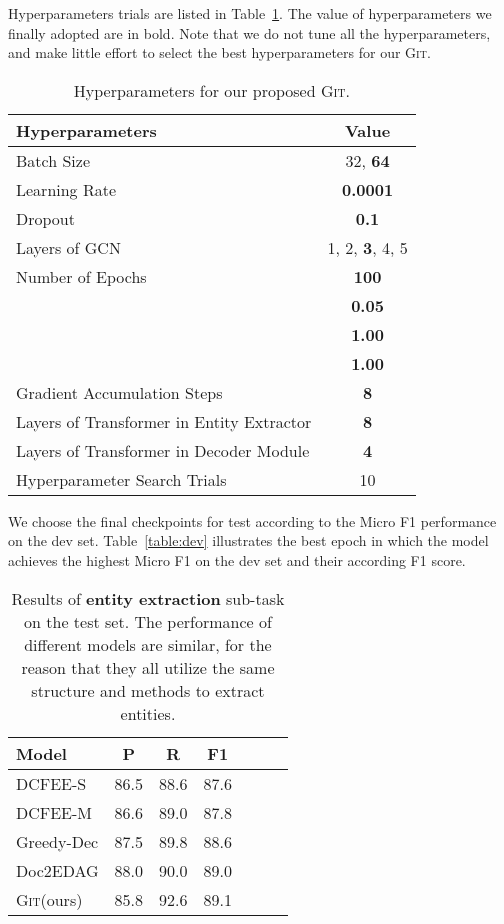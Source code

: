 \documentclass[11pt,a4paper]{article}
\newcommand{\modelname}{\textsc{Git}\xspace}
\begin{document}
Hyperparameters trials are listed in Table~\ref{tab:hyperparam}. 
The value of hyperparameters we finally adopted are in bold. 
Note that we do not tune all the hyperparameters, and make little effort to select the best hyperparameters for our \modelname.

\begin{table}[htbp]
\small
\centering
\begin{tabular}{lc}
\hline
\bf Hyperparameters & \bf Value \\
\hline
Batch Size &  32, \textbf{64} \\
Learning Rate  & \textbf{0.0001}  \\
Dropout &  \textbf{0.1}\\
Layers of GCN & 1, 2, \textbf{3}, 4, 5 \\
Number of Epochs & \textbf{100} \\
 & \textbf{0.05} \\
 & \textbf{1.00} \\
 & \textbf{1.00} \\
Gradient Accumulation Steps & \textbf{8} \\
Layers of Transformer in Entity Extractor & \textbf{8} \\
Layers of Transformer in Decoder Module & \textbf{4} \\
\hline \hline
Hyperparameter Search Trials & 10 \\
\hline
\end{tabular}
\caption{Hyperparameters for our proposed \modelname.
}
\label{tab:hyperparam}
\end{table}

We choose the final checkpoints for test according to the Micro F1 performance on the dev set. 
Table~\ref{table:dev} illustrates the best epoch in which the model achieves the highest Micro F1 on the dev set and their according F1 score.

\begin{table}[htbp]
\centering
\begin{tabular}{lcccccc}
\hline
\bf Model & \bf P & \bf R & \bf F1 \\
\hline
DCFEE-S  & 86.5 & 88.6 & 87.6 \\
DCFEE-M  & 86.6 & 89.0 & 87.8 \\
Greedy-Dec & 87.5 & 89.8 & 88.6 \\
Doc2EDAG  &  88.0 & 90.0 & 89.0\\
\hline
\modelname (ours) & 85.8 & 92.6 & 89.1 \\
\hline
\end{tabular}
\caption{Results of \textbf{entity extraction} sub-task on the test set. The performance of different models are similar, for the reason that they all utilize the same structure and methods to extract entities.
}
\label{table:ner}
\end{table}
\end{document}
